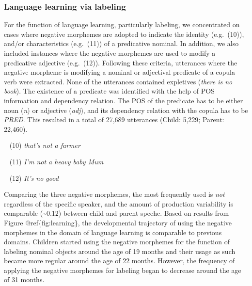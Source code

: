 \documentclass[10pt, letterpaper]{article}
\begin{document}
\hypertarget{language-learning-via-labeling}{%
\subsubsection{Language learning via
labeling}\label{language-learning-via-labeling}}

For the function of language learning, particularly labeling, we
concentrated on cases where negative morphemes are adopted to indicate
the identity (e.g.~(10)), and/or characteristics (e.g.~(11)) of a
predicative nominal. In addition, we also included instances where the
negative morphemes are used to modify a predicative adjective
(e.g.~(12)). Following these criteria, utterances where the negative
morpheme is modifying a nominal or adjectival predicate of a copula verb
were extracted. None of the utterances contained expletives (\emph{there
is no book}). The existence of a predicate was identified with the help
of POS information and dependency relation. The POS of the predicate has
to be either noun (\emph{n}) or adjective (\emph{adj}), and its
dependency relation with the copula has to be \emph{PRED}. This resulted
in a total of 27,689 utterances (Child: 5,229; Parent: 22,460).

~ (10) \emph{that's not a farmer}

~ (11) \emph{I'm not a heavy baby Mum}

~ (12) \emph{It's no good}

Comparing the three negative morphemes, the most frequently used is
\emph{not} regardless of the specific speaker, and the amount of
production variability is comparable (\textasciitilde0.12) between child
and parent speehc. Based on results from Figure @ref\{fig:learning\},
the developmental trajectory of using the negative morphemes in the
domain of language learning is comparable to previous domains. Children
started using the negative morphemes for the function of labeling
nominal objects around the age of 19 months and their usage as such
became more regular around the age of 22 months. However, the frequency
of applying the negative morphemes for labeling began to decrease around
the age of 31 months.
\end{document}
